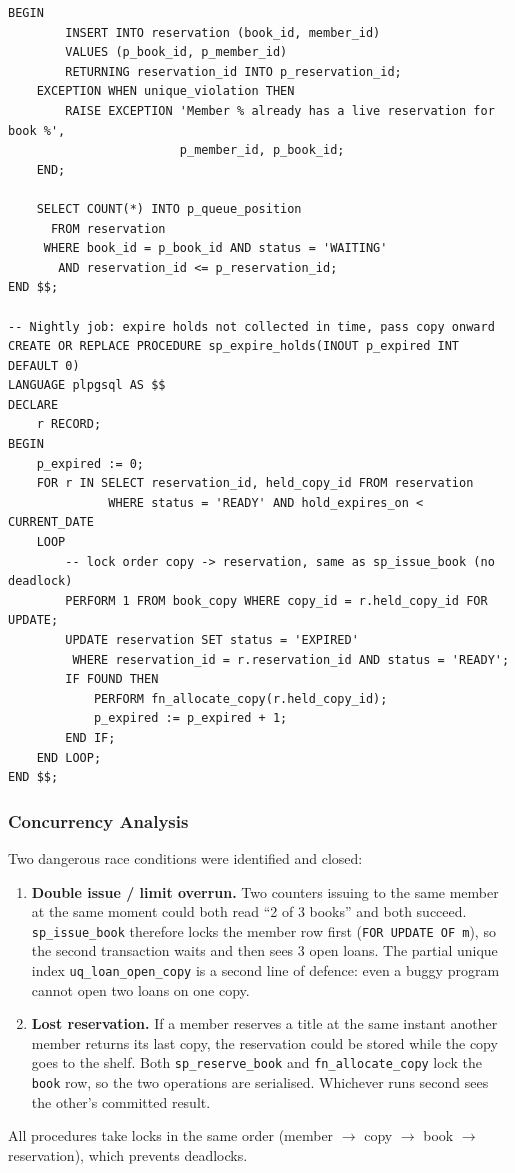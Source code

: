 \documentclass[11pt,a4paper]{report}
\begin{document}
\begin{lstlisting}[caption={Queue allocation and reservation procedures}, label={lst:resv}]
    BEGIN
        INSERT INTO reservation (book_id, member_id)
        VALUES (p_book_id, p_member_id)
        RETURNING reservation_id INTO p_reservation_id;
    EXCEPTION WHEN unique_violation THEN
        RAISE EXCEPTION 'Member % already has a live reservation for book %',
                        p_member_id, p_book_id;
    END;

    SELECT COUNT(*) INTO p_queue_position
      FROM reservation
     WHERE book_id = p_book_id AND status = 'WAITING'
       AND reservation_id <= p_reservation_id;
END $$;

-- Nightly job: expire holds not collected in time, pass copy onward
CREATE OR REPLACE PROCEDURE sp_expire_holds(INOUT p_expired INT DEFAULT 0)
LANGUAGE plpgsql AS $$
DECLARE
    r RECORD;
BEGIN
    p_expired := 0;
    FOR r IN SELECT reservation_id, held_copy_id FROM reservation
              WHERE status = 'READY' AND hold_expires_on < CURRENT_DATE
    LOOP
        -- lock order copy -> reservation, same as sp_issue_book (no deadlock)
        PERFORM 1 FROM book_copy WHERE copy_id = r.held_copy_id FOR UPDATE;
        UPDATE reservation SET status = 'EXPIRED'
         WHERE reservation_id = r.reservation_id AND status = 'READY';
        IF FOUND THEN
            PERFORM fn_allocate_copy(r.held_copy_id);
            p_expired := p_expired + 1;
        END IF;
    END LOOP;
END $$;
\end{lstlisting}

\subsubsection{Concurrency Analysis}
Two dangerous race conditions were identified and closed:
\begin{enumerate}
    \item \textbf{Double issue / limit overrun.} Two counters issuing to the same member at the same moment could both read ``2 of 3 books'' and both succeed. \texttt{sp\_issue\_book} therefore locks the member row first (\texttt{FOR UPDATE OF m}), so the second transaction waits and then sees 3 open loans. The partial unique index \texttt{uq\_loan\_open\_copy} is a second line of defence: even a buggy program cannot open two loans on one copy.
    \item \textbf{Lost reservation.} If a member reserves a title at the same instant another member returns its last copy, the reservation could be stored while the copy goes to the shelf. Both \texttt{sp\_reserve\_book} and \texttt{fn\_allocate\_copy} lock the \texttt{book} row, so the two operations are serialised. Whichever runs second sees the other's committed result.
\end{enumerate}
All procedures take locks in the same order (member $\rightarrow$ copy $\rightarrow$ book $\rightarrow$ reservation), which prevents deadlocks.
\end{document}
